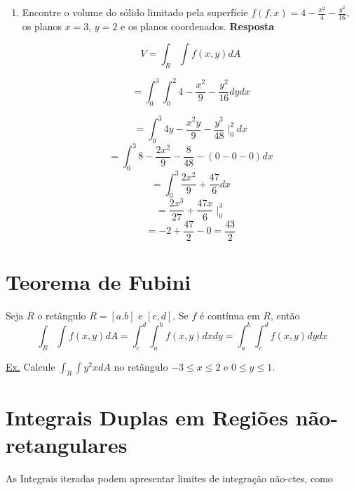 \documentclass[portugues, 11pt]{article}
\begin{document}
    	\begin{enumerate}
    		\item Encontre o volume do sólido limitado pela superfície $ f(f,x)=4 - \frac{x^2}{4} - \frac{y^2}{16}$, os planos $x=3$, $y=2$ e os planos coordenados.
    		\textbf{Resposta}
    		
    		\begin{equation}
    			V = \int_{R}\int{f(x,y) dA}
    		\end{equation}
    		
    		\begin{equation}
    			= \int_0^3\int_0^2{4-\frac{x^2}{9}-\frac{y^2}{16}} dy dx
    		\end{equation}
    		
    		\begin{equation}
    			= \int_0^3{4y-\frac{x^2y}{9}-\frac{y^3}{48}\mid_0^2}dx
    		\end{equation}
    		\begin{equation}
    			= \int_0^3{8-\frac{2x^2}{9}-\frac{8}{48}-(0-0-0)} dx
    		\end{equation}
    		\begin{equation}
    			= \int_0^3{\frac{2x^2}{9}+\frac{47}{6}}dx
    		\end{equation}
    		\begin{equation}
    			= \frac{2x^3}{27}+\frac{47x}{6}\mid_0^3
    		\end{equation}
    		\begin{equation}
    			= -2 + \frac{47}{2} - 0 = \frac{43}{2}
    		\end{equation}
    	\end{enumerate}
	
	\section{Teorema de Fubini}
	Seja $R$ o retângulo $R=[a.b]$ e $[c,d]$. Se $f$ é contínua em $R$, então
	\begin{equation}
		\int_R\int{f(x,y)} dA = \int_c^d\int_a^b{f(x,y)}dxdy 
		= \int_a^b\int_c^d{f(x,y)} dydx
	\end{equation}
	
	\underline{Ex.} Calcule $\int_R\int{y^2x}dA$ no retângulo $-3\leq x\leq 2$ e $0 \leq y \leq 1$.
	
	
	\section{Integrais Duplas em Regiões não-retangulares}
	As Integrais iteradas podem apresentar limites de integração não-ctes, como
	
\end{document}
